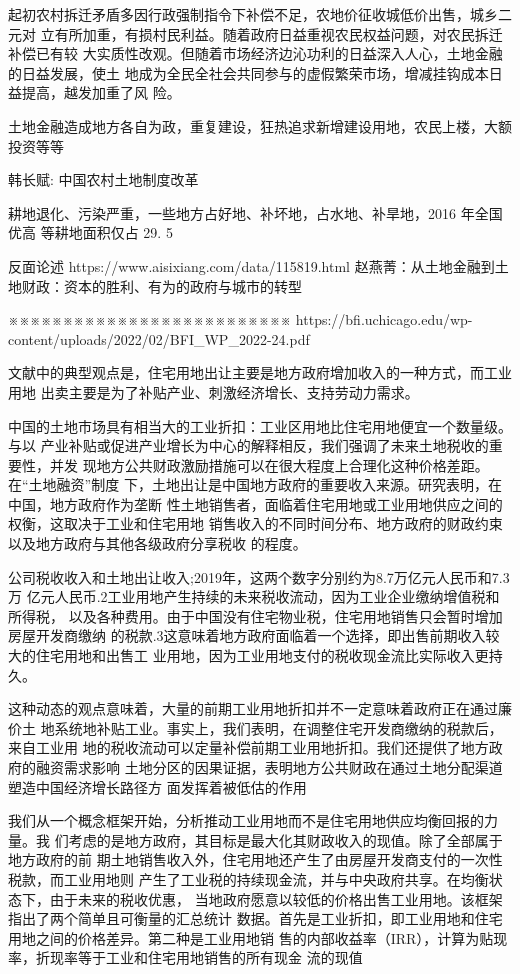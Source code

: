 起初农村拆迁矛盾多因行政强制指令下补偿不足，农地价征收城低价出售，城乡二元对
立有所加重，有损村民利益。随着政府日益重视农民权益问题，对农民拆迁补偿已有较
大实质性改观。但随着市场经济边沁功利的日益深入人心，土地金融的日益发展，使土
地成为全民全社会共同参与的虚假繁荣市场，增减挂钩成本日益提高，越发加重了风
险。


土地金融造成地方各自为政，重复建设，狂热追求新增建设用地，农民上楼，大额投资等等


韩长赋: 中国农村土地制度改革

耕地退化、污染严重，一些地方占好地、补坏地，占水地、补旱地，2016 年全国优高
等耕地面积仅占 29. 5%




反面论述
https://www.aisixiang.com/data/115819.html
赵燕菁：从土地金融到土地财政：资本的胜利、有为的政府与城市的转型

※※※※※※※※※※※※※※※※※※※※※※※※※※
https://bfi.uchicago.edu/wp-content/uploads/2022/02/BFI_WP_2022-24.pdf

文献中的典型观点是，住宅用地出让主要是地方政府增加收入的一种方式，而工业用地
出卖主要是为了补贴产业、刺激经济增长、支持劳动力需求。

中国的土地市场具有相当大的工业折扣：工业区用地比住宅用地便宜一个数量级。与以
产业补贴或促进产业增长为中心的解释相反，我们强调了未来土地税收的重要性，并发
现地方公共财政激励措施可以在很大程度上合理化这种价格差距。在“土地融资”制度
下，土地出让是中国地方政府的重要收入来源。研究表明，在中国，地方政府作为垄断
性土地销售者，面临着住宅用地或工业用地供应之间的权衡，这取决于工业和住宅用地
销售收入的不同时间分布、地方政府的财政约束以及地方政府与其他各级政府分享税收
的程度。

公司税收收入和土地出让收入;2019年，这两个数字分别约为8.7万亿元人民币和7.3万
亿元人民币.2工业用地产生持续的未来税收流动，因为工业企业缴纳增值税和所得税，
以及各种费用。由于中国没有住宅物业税，住宅用地销售只会暂时增加房屋开发商缴纳
的税款.3这意味着地方政府面临着一个选择，即出售前期收入较大的住宅用地和出售工
业用地，因为工业用地支付的税收现金流比实际收入更持久。

这种动态的观点意味着，大量的前期工业用地折扣并不一定意味着政府正在通过廉价土
地系统地补贴工业。事实上，我们表明，在调整住宅开发商缴纳的税款后，来自工业用
地的税收流动可以定量补偿前期工业用地折扣。我们还提供了地方政府的融资需求影响
土地分区的因果证据，表明地方公共财政在通过土地分配渠道塑造中国经济增长路径方
面发挥着被低估的作用

我们从一个概念框架开始，分析推动工业用地而不是住宅用地供应均衡回报的力量。我
们考虑的是地方政府，其目标是最大化其财政收入的现值。除了全部属于地方政府的前
期土地销售收入外，住宅用地还产生了由房屋开发商支付的一次性税款，而工业用地则
产生了工业税的持续现金流，并与中央政府共享。在均衡状态下，由于未来的税收优惠，
当地政府愿意以较低的价格出售工业用地。该框架指出了两个简单且可衡量的汇总统计
数据。首先是工业折扣，即工业用地和住宅用地之间的价格差异。第二种是工业用地销
售的内部收益率（IRR），计算为贴现率，折现率等于工业和住宅用地销售的所有现金
流的现值

